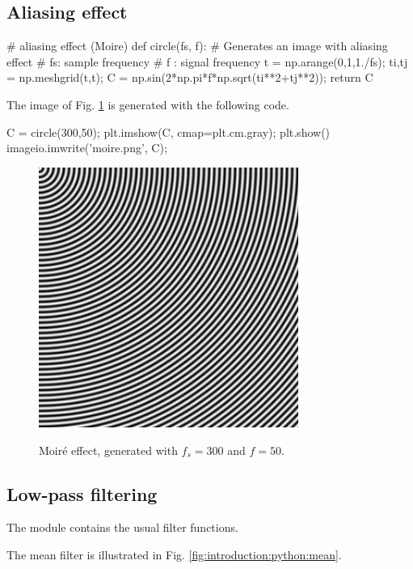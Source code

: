 \subsection{Aliasing effect}
\begin{python}
# aliasing effect (Moire)
def circle(fs, f):
    # Generates an image with aliasing effect
    # fs: sample frequency
    # f : signal frequency
    t = np.arange(0,1,1./fs);
    ti,tj = np.meshgrid(t,t);
    C = np.sin(2*np.pi*f*np.sqrt(ti**2+tj**2));
    return C
\end{python}

The image of Fig. \ref{fig:introduction:python:aliasing} is generated with the following code.

\begin{python}
C = circle(300,50);
plt.imshow(C, cmap=plt.cm.gray);
plt.show()
imageio.imwrite('moire.png', C);
\end{python}

\begin{figure}[H]
 \centering\caption{Moiré effect, generated with $f_s=300$ and $f=50$.}%
 \vspace*{-2pt}%
 \includegraphics[width=8.5cm]{moire.png}%
 \vspace*{-10pt}%
 \label{fig:introduction:python:aliasing}%
\end{figure}


\subsection{Low-pass filtering}
\begin{pcomment}
\begin{premark}The module  contains the usual filter functions. 
\end{premark}
\end{pcomment}
The mean filter is illustrated in Fig. \ref{fig:introduction:python:mean}.

